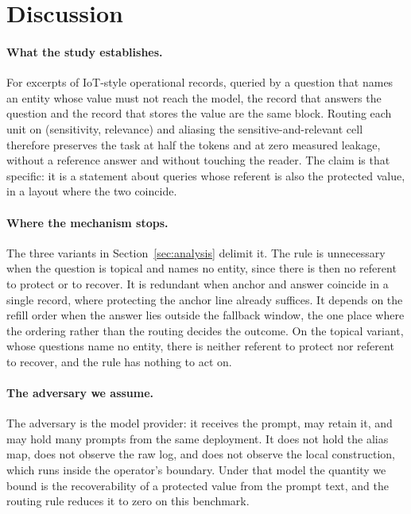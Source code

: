 \section{Discussion}
\label{sec:discussion}



\paragraph{What the study establishes.}
For excerpts of IoT-style operational records, queried by a question that names an entity
whose value must not reach the model, the record that answers the question and the record
that stores the value are the same block. Routing each unit on (sensitivity, relevance) and
aliasing the sensitive-and-relevant cell therefore preserves the task at half the tokens and
at zero measured leakage, without a reference answer and without touching the reader. The
claim is that specific: it is a statement about queries whose referent is also the protected
value, in a layout where the two coincide.

\paragraph{Where the mechanism stops.}
The three variants in Section~\ref{sec:analysis} delimit it. The rule is unnecessary when the
question is topical and names no entity, since there is then no referent to protect or to
recover. It is redundant when anchor and answer coincide in a single record, where protecting
the anchor line already suffices. It depends on the refill order when the answer lies outside
the fallback window, the one place where the ordering rather than the routing decides the
outcome. On the topical variant, whose questions name no entity, there is neither referent to
protect nor referent to recover, and the rule has nothing to act on.

\paragraph{The adversary we assume.}
The adversary is the model provider: it receives the prompt, may retain it, and may hold many
prompts from the same deployment. It does not hold the alias map, does not observe the raw log,
and does not observe the local construction, which runs inside the operator's boundary. Under
that model the quantity we bound is the recoverability of a protected value from the prompt
text, and the routing rule reduces it to zero on this benchmark.

